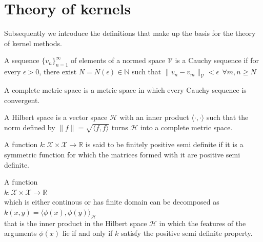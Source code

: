\section{Theory of kernels}
Subsequently we introduce the definitions that make up the basis for the theory of kernel methods.


\begin{definition}
    A sequence $\{v_n\}_{n=1}^{\infty}$ of elements of a normed space $\mathcal{V}$ is a Cauchy sequence if for every $\epsilon>0$, there exist $N=N(\epsilon) \in \mathbb{N}$ such that $\|v_n-v_m\|_{\mathcal{V}}<\epsilon \ \ \forall m,n\geq N$  
\end{definition}


\begin{definition}
    A complete metric space is a metric space in which every Cauchy sequence is convergent.
\end{definition}


\begin{definition}
    A Hilbert space is a vector space $\mathcal{H}$ with an inner product $\langle \cdot, \cdot \rangle$ such that the norm defined by $\|f\|=\sqrt{\langle f, f \rangle}$
turns $\mathcal{H}$ into a complete metric space.
\end{definition}



\begin{definition}
    A function $k: \mathcal{X} \times \mathcal{X} \to \mathbb{R}$ is said to be finitely positive semi definite if it is a symmetric function for which the matrices formed with it are positive semi definite.
\end{definition}

\begin{theorem}    
    A function 
    \\
    $k:\mathcal{X} \times \mathcal{X} \to \mathbb{R}$
    \\
    which is either continous or has finite domain can be decomposed as
    \\
    $k(x,y)=\langle \phi(x), \phi(y) \rangle_{\mathcal{H}}$
    \\
    that is the inner product in the Hilbert space $\mathcal{H}$ in which the features of the arguments $\phi(x)$ lie if and only if $k$ satisfy the positive semi definite property.
\end{theorem}

